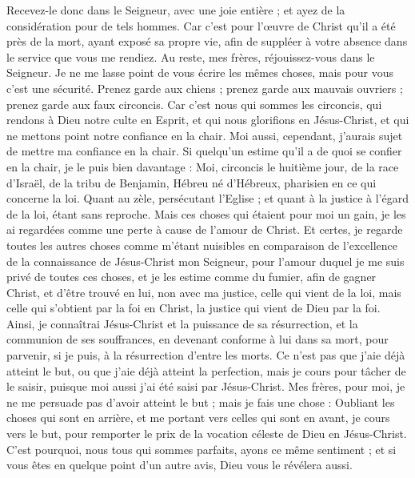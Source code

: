 \begin{multicols}{2}
Recevez-le donc dans le Seigneur, avec une joie entière ; et ayez de la considération pour de tels hommes.
Car c’est pour l’œuvre de Christ qu’il a été près de la mort, ayant exposé sa propre vie, afin de suppléer à votre absence dans le service que vous me rendiez.
\VerseOne{}Au reste, mes frères, réjouissez-vous dans le Seigneur. Je ne me lasse point de vous écrire les mêmes choses, mais pour vous c'est une sécurité.
Prenez garde aux chiens ; prenez garde aux mauvais ouvriers ; prenez garde aux faux circoncis.
Car c'est nous qui sommes les circoncis, qui rendons à Dieu notre culte en Esprit, et qui nous glorifions en Jésus-Christ, et qui ne mettons point notre confiance en la chair.
Moi aussi, cependant, j’aurais sujet de mettre ma confiance en la chair. Si quelqu'un estime qu'il a de quoi se confier en la chair, je le puis bien davantage :
Moi, circoncis le huitième jour, de la race d'Israël, de la tribu de Benjamin, Hébreu né d'Hébreux, pharisien en ce qui concerne la loi.
Quant au zèle, persécutant l'Eglise ; et quant à la justice à l’égard de la loi, étant sans reproche.
Mais ces choses qui étaient pour moi un gain, je les ai regardées comme une perte à cause de l'amour de Christ.
Et certes, je regarde toutes les autres choses comme m'étant nuisibles en comparaison de l'excellence de la connaissance de Jésus-Christ mon Seigneur, pour l'amour duquel je me suis privé de toutes ces choses, et je les estime comme du fumier, afin de gagner Christ,
et d’être trouvé en lui, non avec ma justice, celle qui vient de la loi, mais celle qui s’obtient par la foi en Christ, la justice qui vient de Dieu par la foi.
Ainsi, je connaîtrai Jésus-Christ et la puissance de sa résurrection, et la communion de ses souffrances, en devenant conforme à lui dans sa mort, pour parvenir,
si je puis, à la résurrection d’entre les morts.
Ce n’est pas que j'aie déjà atteint le but, ou que j’aie déjà atteint la perfection, mais je cours pour tâcher de le saisir, puisque moi aussi j'ai été saisi par Jésus-Christ.
Mes frères, pour moi, je ne me persuade pas d'avoir atteint le but ;
mais je fais une chose : Oubliant les choses qui sont en arrière, et me portant vers celles qui sont en avant, je cours vers le but, pour remporter le prix de la vocation céleste de Dieu en Jésus-Christ.
C'est pourquoi, nous tous qui sommes parfaits, ayons ce même sentiment ; et si vous êtes en quelque point d’un autre avis, Dieu vous le révélera aussi.

\end{multicols}
